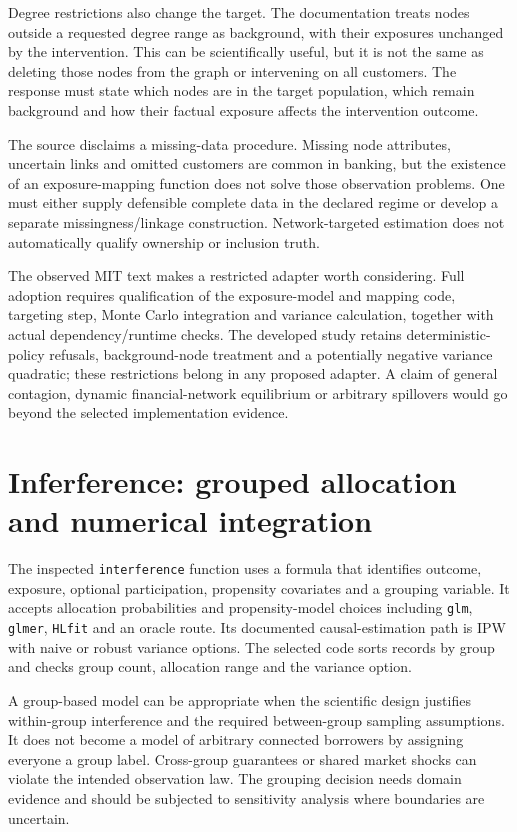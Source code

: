 Degree restrictions also change the target. The documentation treats nodes
outside a requested degree range as background, with their exposures unchanged
by the intervention. This can be scientifically useful, but it is not the
same as deleting those nodes from the graph or intervening on all customers.
The response must state which nodes are in the target population, which remain
background and how their factual exposure affects the intervention outcome.

The source disclaims a missing-data procedure. Missing node attributes,
uncertain links and omitted customers are common in banking, but the existence
of an exposure-mapping function does not solve those observation problems.
One must either supply defensible complete data in the declared regime or
develop a separate missingness/linkage construction. Network-targeted estimation
does not automatically qualify ownership or inclusion truth.

The observed MIT text makes a restricted adapter worth considering. Full adoption
requires qualification of the exposure-model and mapping code, targeting step,
Monte Carlo integration and variance calculation, together with actual
dependency/runtime checks. The developed study retains deterministic-policy
refusals, background-node treatment and a potentially negative variance
quadratic; these restrictions belong in any proposed adapter. A claim of general contagion, dynamic financial-network equilibrium or
arbitrary spillovers would go beyond the selected implementation evidence.

\section{Inferference: grouped allocation and numerical integration}

The inspected \texttt{interference} function uses a formula that identifies
outcome, exposure, optional participation, propensity covariates and a grouping
variable. It accepts allocation probabilities and propensity-model choices
including \texttt{glm}, \texttt{glmer}, \texttt{HLfit} and an oracle route.
Its documented causal-estimation path is IPW with naive or robust variance
options. The selected code sorts records by group and checks group count,
allocation range and the variance option. \cite{v13_sw_inferference}

A group-based model can be appropriate when the scientific design justifies
within-group interference and the required between-group sampling assumptions.
It does not become a model of arbitrary connected borrowers by assigning
everyone a group label. Cross-group guarantees or shared market shocks can
violate the intended observation law. The grouping decision needs domain
evidence and should be subjected to sensitivity analysis where boundaries
are uncertain.

